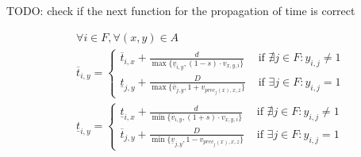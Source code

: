 \documentclass[../main.tex]{subfiles}
\begin{document}
TODO: check if the next function for the propagation of time is correct

\begin{align*}
\label{func:propagateTime}
&\forall i \in F,\forall (x,y)\in A\\
&\overline t_{i,y}=\begin{cases}
\overline t_{i,x}+\frac d {\max\{\underline v_{i,y}, (1-s)\cdot v_{x,y,i}\}} 
&\text{ if } \nexists j\in F : y_{i,j}\neq 1\\
\underline t_{j,y}+\frac D{\max\{\overline v_{j,y},  1+ v_{prec_j(x),x,z}\}}
&\text{ if } \exists j\in F : y_{i,j}= 1
\end{cases}\\
&\underline t_{i,y}=\begin{cases}
\underline t_{i,x}+\frac d {\min\{\overline v_{i,y}, (1+s)\cdot v_{x,y,i}\}} &\text{ if } \nexists j\in F : y_{i,j}\neq 1\\
\overline t_{j,y}+\frac D{\min\{\underline v_{j,y},  1- v_{prec_j(x),x,z}\}}
&\text{ if } \exists j\in F : y_{i,j}= 1
\end{cases}
\end{align*}
\end{document}
